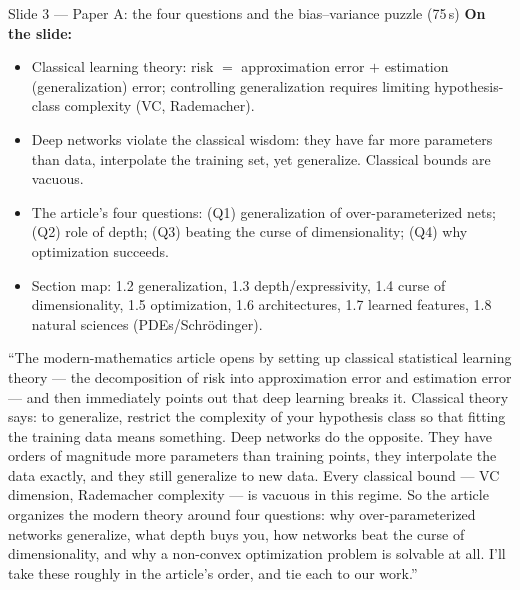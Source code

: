 \documentclass[11pt]{article}
\begin{document}
\begin{slide}{Slide 3 --- Paper A: the four questions and the bias--variance puzzle (75\,s)}
\textbf{On the slide:}
\begin{itemize}[leftmargin=*]
\item Classical learning theory: risk $=$ approximation error $+$ estimation (generalization) error;
controlling generalization requires limiting hypothesis-class complexity (VC, Rademacher).
\item Deep networks violate the classical wisdom: they have far more parameters than data, interpolate
the training set, yet generalize. Classical bounds are vacuous.
\item The article's four questions: (Q1) generalization of over-parameterized nets; (Q2) role of
depth; (Q3) beating the curse of dimensionality; (Q4) why optimization succeeds.
\item Section map: 1.2 generalization, 1.3 depth/expressivity, 1.4 curse of dimensionality,
1.5 optimization, 1.6 architectures, 1.7 learned features, 1.8 natural sciences (PDEs/Schr\"odinger).
\end{itemize}
\end{slide}

\begin{say}
``The modern-mathematics article opens by setting up classical statistical learning theory --- the
decomposition of risk into approximation error and estimation error --- and then immediately points
out that deep learning breaks it. Classical theory says: to generalize, restrict the complexity of
your hypothesis class so that fitting the training data means something. Deep networks do the
opposite. They have orders of magnitude more parameters than training points, they interpolate the
data exactly, and they still generalize to new data. Every classical bound --- VC dimension,
Rademacher complexity --- is vacuous in this regime. So the article organizes the modern theory
around four questions: why over-parameterized networks generalize, what depth buys you, how networks
beat the curse of dimensionality, and why a non-convex optimization problem is solvable at all. I'll
take these roughly in the article's order, and tie each to our work.''
\end{say}
\end{document}
